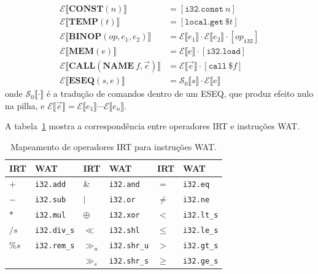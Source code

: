 \begin{Definition}\label{def:trans-exprs}
\begin{align*}
\mathcal{E}\llbracket \mathbf{CONST}(n) \rrbracket
  &= [\mathtt{i32.const}\ n] \\
\mathcal{E}\llbracket \mathbf{TEMP}(t) \rrbracket
  &= [\mathtt{local.get}\ \$t] \\
\mathcal{E}\llbracket \mathbf{BINOP}(\mathit{op}, e_1, e_2) \rrbracket
  &= \mathcal{E}\llbracket e_1 \rrbracket \cdot \mathcal{E}\llbracket e_2 \rrbracket \cdot [\mathit{op}_{\mathtt{i32}}] \\
\mathcal{E}\llbracket \mathbf{MEM}(e) \rrbracket
  &= \mathcal{E}\llbracket e \rrbracket \cdot [\mathtt{i32.load}] \\
\mathcal{E}\llbracket \mathbf{CALL}(\mathbf{NAME}\ f, \vec{e}) \rrbracket
  &= \mathcal{E}\llbracket \vec{e} \rrbracket \cdot [\mathtt{call}\ \$f] \\
\mathcal{E}\llbracket \mathbf{ESEQ}(s, e) \rrbracket
  &= \mathcal{S}_0\llbracket s \rrbracket \cdot \mathcal{E}\llbracket e \rrbracket
\end{align*}
onde $\mathcal{S}_0\llbracket \cdot \rrbracket$ é a tradução de comandos
dentro de um ESEQ, que produz efeito nulo na pilha, e
$\mathcal{E}\llbracket \vec{e} \rrbracket = \mathcal{E}\llbracket e_1 \rrbracket \cdots \mathcal{E}\llbracket e_n \rrbracket$.
\end{Definition}

A tabela~\ref{tab:binop} mostra a correspondência entre operadores IRT e
instruções WAT.

\begin{table}[htbp]
\centering
\begin{tabular}{ll|ll|ll}
\hline
\textbf{IRT} & \textbf{WAT} & \textbf{IRT} & \textbf{WAT} & \textbf{IRT} & \textbf{WAT} \\
\hline
$+$  & \texttt{i32.add}   & \&  & \texttt{i32.and}   & $=$  & \texttt{i32.eq}   \\
$-$  & \texttt{i32.sub}   & $|$ & \texttt{i32.or}    & $\neq$ & \texttt{i32.ne} \\
$*$  & \texttt{i32.mul}   & $\oplus$ & \texttt{i32.xor} & $<$ & \texttt{i32.lt\_s} \\
$/s$ & \texttt{i32.div\_s}& $\ll$ & \texttt{i32.shl} & $\leq$ & \texttt{i32.le\_s} \\
$\%s$& \texttt{i32.rem\_s}& $\gg_u$ & \texttt{i32.shr\_u} & $>$ & \texttt{i32.gt\_s} \\
     &                    & $\gg_s$ & \texttt{i32.shr\_s} & $\geq$ & \texttt{i32.ge\_s} \\
\hline
\end{tabular}
\caption{Mapeamento de operadores IRT para instruções WAT.}\label{tab:binop}
\end{table}

